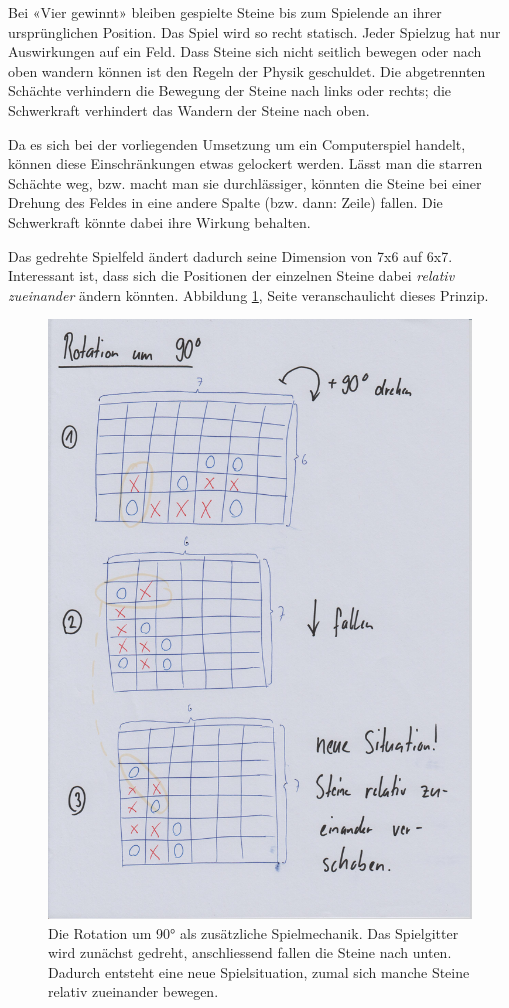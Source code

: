 \documentclass[a4paper,11pt,hidelinks]{scrartcl}
\newcommand{\imgref}[1]{{Abbildung \ref{#1}, Seite \pageref{#1}}}
\begin{document}
Bei «Vier gewinnt» bleiben gespielte Steine bis zum Spielende an ihrer ursprünglichen Position. Das Spiel wird so recht statisch. Jeder Spielzug hat nur Auswirkungen auf ein Feld. Dass Steine sich nicht seitlich bewegen oder nach oben wandern können ist den Regeln der Physik geschuldet. Die abgetrennten Schächte verhindern die Bewegung der Steine nach links oder rechts; die Schwerkraft verhindert das Wandern der Steine nach oben.

Da es sich bei der vorliegenden Umsetzung um ein Computerspiel handelt, können diese Einschränkungen etwas gelockert werden. Lässt man die starren Schächte weg, bzw. macht man sie durchlässiger, könnten die Steine bei einer Drehung des Feldes in eine andere Spalte (bzw. dann: Zeile) fallen. Die Schwerkraft könnte dabei ihre Wirkung behalten.

Das gedrehte Spielfeld ändert dadurch seine Dimension von 7x6 auf 6x7. Interessant ist, dass sich die Positionen der einzelnen Steine dabei \textit{relativ zueinander} ändern könnten. \imgref{fig:rotation} veranschaulicht dieses Prinzip.

\begin{figure}
    \centering
    \includegraphics[width=0.9\linewidth]{pics/rotation-papier.jpg}
    \caption{Die Rotation um 90° als zusätzliche Spielmechanik. Das Spielgitter wird zunächst gedreht, anschliessend fallen die Steine nach unten. Dadurch entsteht eine neue Spielsituation, zumal sich manche Steine relativ zueinander bewegen.}
    \label{fig:rotation}
\end{figure}
\end{document}
